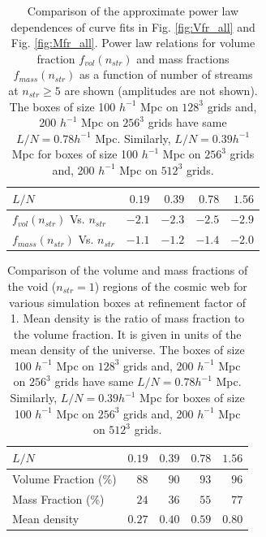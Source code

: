 \begin{table}
\centering
  \caption{Comparison of the approximate power law dependences of curve fits in Fig. \ref{fig:Vfr_all} and Fig. \ref{fig:Mfr_all}. Power law relations for volume fraction $f_{vol}(n_{str})$ and mass fractions $f_{mass} (n_{str}) $ as a function of number of streams at $n_{str} \geq 5$ are shown (amplitudes are not shown). The boxes of size 100 $h^{-1}$ Mpc on  $128^{3}$ grids and, 200 $h^{-1}$ Mpc on  $256^{3}$ grids have same  $L/N = 0.78 h^{-1}$ Mpc. Similarly, $L/N = 0.39 h^{-1}$ Mpc for boxes of size 100 $h^{-1}$ Mpc on  $256^{3}$ grids and, 200 $h^{-1}$ Mpc on  $512^{3}$ grids.}
\begin{tabular}{|l|r|r|r|r|}
\hline
$L/N$                & $0.19$ & $0.39$& $0.78$ & $1.56$  \\ \hline
$f_{vol} (n_{str}) $ Vs. $n_{str}$                 & $-2.1$   & $-2.3$    & $-2.5$      & $-2.9$  \\ \hline
$f_{mass} (n_{str}) $   Vs. $n_{str}$            & $-1.1$   & $-1.2$   & $-1.4$       & $-2.0$     \\ \hline
\end{tabular}
 \label{tab:Compare_Slopes}
\end{table}



 \begin{table}
 \centering
  \caption{Comparison of the volume and mass fractions of the void ($n_{str} = 1$) regions of the cosmic web for various simulation boxes at refinement factor of 1. Mean density is the ratio of mass fraction to the volume fraction. It is given in units of the mean density of the universe. The boxes of size 100 $h^{-1}$ Mpc on  $128^{3}$ grids and, 200 $h^{-1}$ Mpc on  $256^{3}$ grids have same  $L/N = 0.78 h^{-1}$ Mpc. Similarly, $L/N = 0.39 h^{-1}$ Mpc for boxes of size 100 $h^{-1}$ Mpc on  $256^{3}$ grids and, 200 $h^{-1}$ Mpc on  $512^{3}$ grids.}
\begin{tabular}{|l|r|r|r|r|}
\hline
$L/N$                & $0.19$ & $0.39$& $0.78$ & $1.56$  \\ \hline
Volume Fraction (\%)                 & $88$   & $90$    & $93$      & $96$  \\ \hline
Mass Fraction   (\%)               & $24$   & $36$   & $55$       & $77$     \\ \hline
Mean density                    & $0.27$ & $0.40$    & $0.59$        & $0.80$   \\ \hline
\end{tabular}
 \label{tab:Compare_LN}
\end{table}


